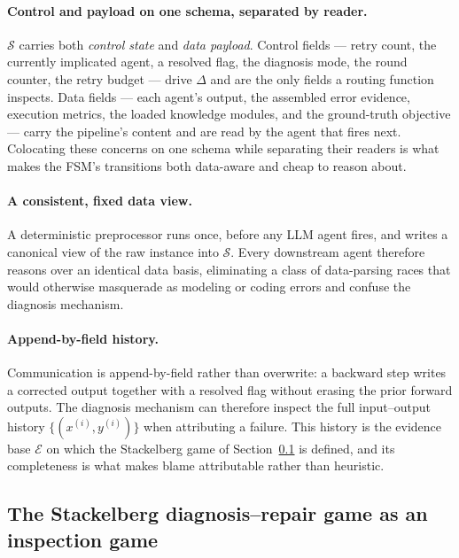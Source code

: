 \documentclass[a4paper,fleqn]{cas-sc}
\newcommand{\Ecal}{\mathcal{E}}
\newcommand{\Scal}{\mathcal{S}}
\begin{document}
\paragraph{Control and payload on one schema, separated by reader.} $\Scal$
carries both \emph{control state} and \emph{data payload}. Control fields ---
retry count, the currently implicated agent, a resolved flag, the diagnosis
mode, the round counter, the retry budget --- drive $\Delta$ and are the only
fields a routing function inspects. Data fields --- each agent's output, the
assembled error evidence, execution metrics, the loaded knowledge modules, and
the ground-truth objective --- carry the pipeline's content and are read by the
agent that fires next. Colocating these concerns on one schema while
separating their readers is what makes the FSM's transitions both data-aware
and cheap to reason about.

\paragraph{A consistent, fixed data view.} A deterministic preprocessor runs
once, before any LLM agent fires, and writes a canonical view of the raw
instance into $\Scal$. Every downstream agent therefore reasons over an
identical data basis, eliminating a class of data-parsing races that would
otherwise masquerade as modeling or coding errors and confuse the diagnosis
mechanism.

\paragraph{Append-by-field history.} Communication is append-by-field rather
than overwrite: a backward step writes a corrected output together with a
resolved flag without erasing the prior forward outputs. The diagnosis
mechanism can therefore inspect the full input--output history
$\{(x^{(i)},y^{(i)})\}$ when attributing a failure. This history is the
evidence base $\Ecal$ on which the Stackelberg game of
Section~\ref{sec:stackelberg} is defined, and its completeness is what makes
blame attributable rather than heuristic.

\subsection{The Stackelberg diagnosis--repair game as an inspection game}
\label{sec:stackelberg}
\end{document}
